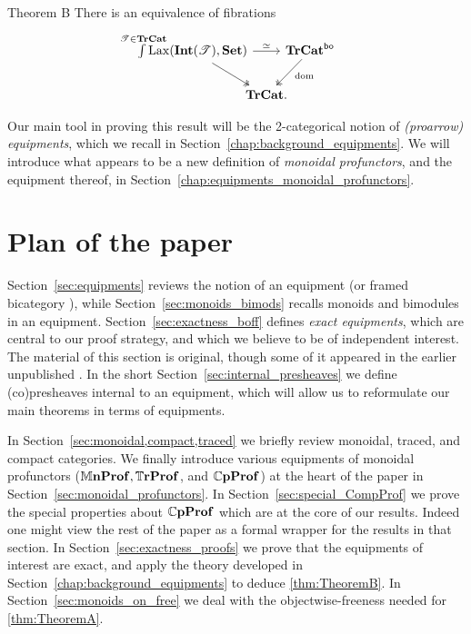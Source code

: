 \documentclass[11pt,oneside,article]{memoir}
\begin{document}
\begin{named}{Theorem B}
    \label{thm:TheoremB_statement}
  There is an equivalence of fibrations
  \begin{equation*}
    \begin{tikzcd}[column sep=-1em]
      \int\limits^{\mathclap{\cat{T}\in\TrCat}} \Lax(\Int(\cat{T}),\Set)
        \ar[rr,"\equiv"] \ar[dr,two heads]
      && \TrCat^{\bo} \ar[dl,two heads,"\dom" pos=.4] \\
      & \TrCat. &
    \end{tikzcd}
  \end{equation*}
\end{named}

Our main tool in proving this result will be the 2-categorical notion of \emph{(proarrow)
equipments}, which we recall in Section~\ref{chap:background_equipments}. We will introduce what
appears to be a new definition of \emph{monoidal profunctors}, and the equipment thereof, in
Section~\ref{chap:equipments_monoidal_profunctors}.

\section{Plan of the paper}

Section~\ref{sec:equipments} reviews the notion of an equipment (or framed bicategory
\cite{Shulman}), while Section~\ref{sec:monoids_bimods} recalls monoids and bimodules in an
equipment. Section~\ref{sec:exactness_boff} defines \emph{exact equipments}, which are central to
our proof strategy, and which we believe to be of independent interest. The material of this section
is original, though some of it appeared in the earlier unpublished \cite{Schultz2015}. In the short
Section~\ref{sec:internal_presheaves} we define (co)presheaves internal to an equipment, which will
allow us to reformulate our main theorems in terms of equipments.

In Section~\ref{sec:monoidal,compact,traced} we briefly review monoidal, traced, and compact
categories. We finally introduce various equipments of monoidal profunctors ($\mathbb{M}\mathbf{nProf}, \mathbb{T}\mathbf{rProf}$,
and $\mathbb{C}\mathbf{pProf}$) at the heart of the paper in Section~\ref{sec:monoidal_profunctors}. In
Section~\ref{sec:special_CompProf} we prove the special properties about $\mathbb{C}\mathbf{pProf}$ which are at
the core of our results. Indeed one might view the rest of the paper as a formal wrapper for the
results in that section. In Section~\ref{sec:exactness_proofs} we prove that the equipments of
interest are exact, and apply the theory developed in Section~\ref{chap:background_equipments} to
deduce \ref{thm:TheoremB}. In Section~\ref{sec:monoids_on_free} we deal with the objectwise-freeness
needed for \ref{thm:TheoremA}.
\end{document}
